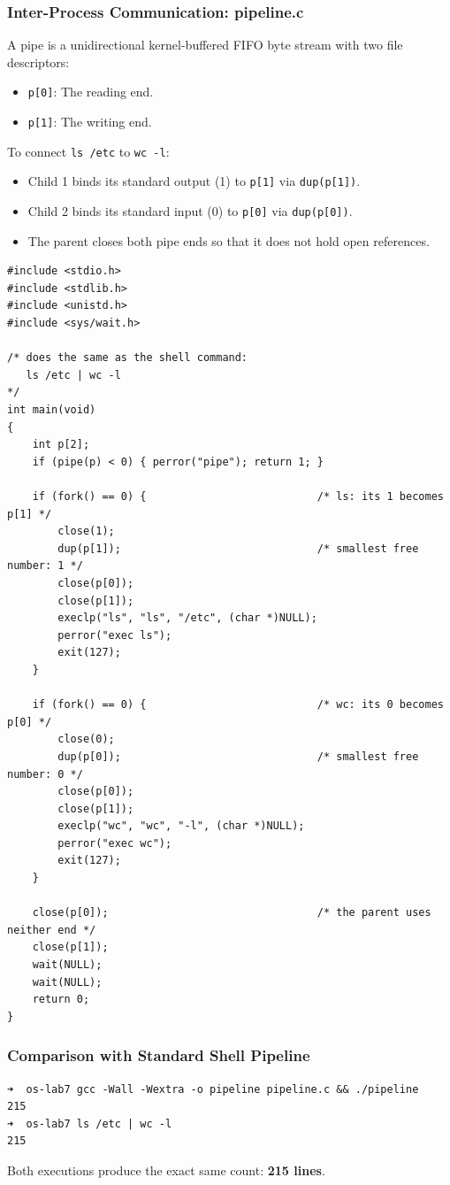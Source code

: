 \documentclass{labreport}
\begin{document}
\subsubsection{Inter-Process Communication: pipeline.c}
A pipe is a unidirectional kernel-buffered FIFO byte stream with two file descriptors:
\begin{itemize}[noitemsep]
    \item \texttt{p[0]}: The reading end.
    \item \texttt{p[1]}: The writing end.
\end{itemize}
To connect \texttt{ls /etc} to \texttt{wc -l}:
\begin{itemize}[noitemsep]
    \item Child 1 binds its standard output (1) to \texttt{p[1]} via \texttt{dup(p[1])}.
    \item Child 2 binds its standard input (0) to \texttt{p[0]} via \texttt{dup(p[0])}.
    \item The parent closes both pipe ends so that it does not hold open references.
\end{itemize}

\begin{lstlisting}[style=c]
#include <stdio.h>
#include <stdlib.h>
#include <unistd.h>
#include <sys/wait.h>

/* does the same as the shell command:
   ls /etc | wc -l
*/
int main(void)
{
    int p[2];
    if (pipe(p) < 0) { perror("pipe"); return 1; }

    if (fork() == 0) {                           /* ls: its 1 becomes p[1] */
        close(1);
        dup(p[1]);                               /* smallest free number: 1 */
        close(p[0]);
        close(p[1]);
        execlp("ls", "ls", "/etc", (char *)NULL);
        perror("exec ls");
        exit(127);
    }

    if (fork() == 0) {                           /* wc: its 0 becomes p[0] */
        close(0);
        dup(p[0]);                               /* smallest free number: 0 */
        close(p[0]);
        close(p[1]);
        execlp("wc", "wc", "-l", (char *)NULL);
        perror("exec wc");
        exit(127);
    }

    close(p[0]);                                 /* the parent uses neither end */
    close(p[1]);
    wait(NULL);
    wait(NULL);
    return 0;
}
\end{lstlisting}

\subsubsection{Comparison with Standard Shell Pipeline}
\begin{lstlisting}[style=bash]
➜  os-lab7 gcc -Wall -Wextra -o pipeline pipeline.c && ./pipeline
215
➜  os-lab7 ls /etc | wc -l
215
\end{lstlisting}
Both executions produce the exact same count: \textbf{215 lines}.
\end{document}
